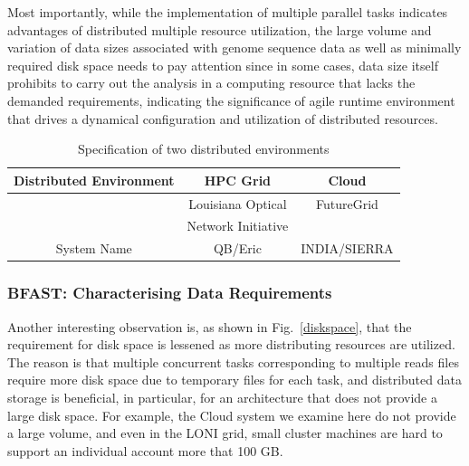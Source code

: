 \documentclass{acm_proc_article-sp}
\begin{document}
Most importantly, while the implementation of multiple parallel tasks indicates advantages of distributed multiple resource utilization, the large volume and variation of data sizes associated with genome sequence data as well as minimally required disk space needs to pay attention since in some cases, data size itself prohibits to carry out the analysis in a computing resource that lacks the demanded requirements, indicating the significance of agile runtime environment that drives a dynamical configuration and utilization of distributed resources. 






 \begin{table}
 \begin{tabular}{|c|cc|} 
 \hline 
Distributed Environment &  HPC Grid &  Cloud \\ \hline
 &  Louisiana Optical & FutureGrid \\
& Network Initiative  & \\
System  Name &  QB/Eric   &  INDIA/SIERRA \\
 \hline
 \end{tabular}
\caption{Specification of two distributed environments}
\label{table:two-systems} 
\end{table}
 
\subsubsection{BFAST: Characterising Data Requirements}


Another interesting observation is, as shown in Fig.~\ref{diskspace}, that the requirement for disk space is lessened as more distributing resources are utilized. The reason is that multiple concurrent tasks corresponding to multiple reads files require more disk space due to temporary files for each task, and distributed data storage is beneficial, in particular, for an architecture that does not provide a large disk space.  For example, the Cloud system we examine here do not provide a large volume, and even in the LONI grid, small cluster machines are hard to support an individual account more that 100 GB.
\end{document}
